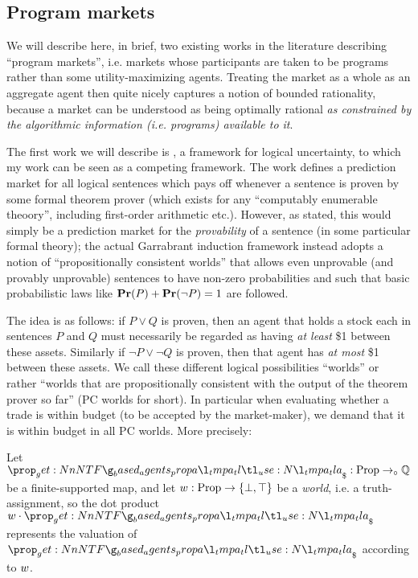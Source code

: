 \documentclass{article}
\begin{document}
\subsection{Program markets}

We will describe here, in brief, two existing works in the literature describing ``program markets'', i.e. markets whose participants are taken to be programs rather than some utility-maximizing agents. Treating the market as a whole as an aggregate agent then quite nicely captures a notion of bounded rationality, because a market can be understood as being optimally rational \emph{as constrained by the algorithmic information (i.e. programs) available to it}. 

The first work we will describe is \cite{garrabrantLogicalInduction2016}, a framework for logical uncertainty, to which my work \cite{abhimanyupallavisudhirBettingWhatNeither2023} can be seen as a competing framework. The work defines a prediction market for all logical sentences which pays off whenever a sentence is proven by some formal theorem prover (which exists for any ``computably enumerable theoory'', including first-order arithmetic etc.). However, as stated, this would simply be a prediction market for the \emph{provability} of a sentence (in some particular formal theory); the actual Garrabrant induction framework instead adopts a notion of ``propositionally consistent worlds'' that allows even unprovable (and provably unprovable) sentences to have non-zero probabilities and such that basic probabilistic laws like $\mathbf{Pr}(P)+\mathbf{Pr}(\lnot P)=1$ are followed.

The idea is as follows: if $P\lor Q$ is proven, then an agent that holds a stock each in sentences $P$ and $Q$ must necessarily be regarded as having \emph{at least} \$1 between these assets. Similarly if $\lnot P\lor\lnot Q$ is proven, then that agent has \emph{at most} \$1 between these assets. We call these different logical possibilities ``worlds'' or rather ``worlds that are propositionally consistent with the output of the theorem prover so far'' (PC worlds for short). In particular when evaluating whether a trade is within budget (to be accepted by the market-maker), we demand that it is within budget in all PC worlds. More precisely:

\begin{definition}
    Let $\inventory:\Props\too\Rats$ be a finite-supported map, and let $w:\operatorname{Prop}\to\{\bot,\top\}$ be a \emph{world}, i.e. a truth-assignment, so the dot product $\world\cdot\inventory$ represents the valuation of $\inventory$ according to $w$.
\end{definition}
\end{document}
